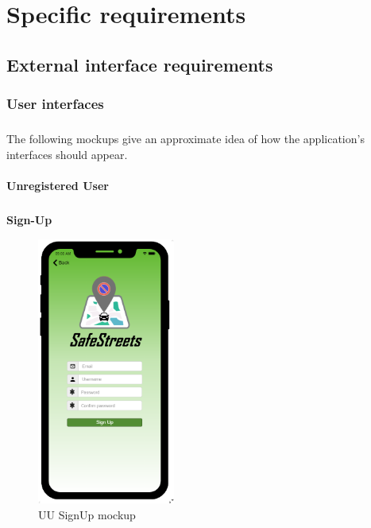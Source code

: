 \chapter{Specific requirements}
		\section{External interface requirements}
			\subsection{User interfaces}
				\paragraph{}
					The following mockups give an approximate idea of how the application's interfaces should appear.
				\subsubsection{Unregistered User}
					\paragraph{}
						\begin{center}
						{\small \textbf{Sign-Up}}
						\end{center}
						\vspace{-5mm}
						\begin{figure}[ht]
								\centering
							\includegraphics[height=8.8cm] {images/MockUp/User/SignUp.pdf}
								\caption{UU SignUp mockup}
						\end{figure}
				\clearpage
				
